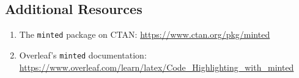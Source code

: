 \subsection*{Additional Resources}

\begin{enumerate}
    \item The \texttt{minted} package on CTAN: \href{https://www.ctan.org/pkg/minted}{https://www.ctan.org/pkg/minted}
    \item Overleaf's \texttt{minted} documentation: \href{https://www.overleaf.com/learn/latex/Code\_Highlighting\_with\_minted}{https://www.overleaf.com/learn/latex/Code\_Highlighting\_with\_minted}
\end{enumerate}